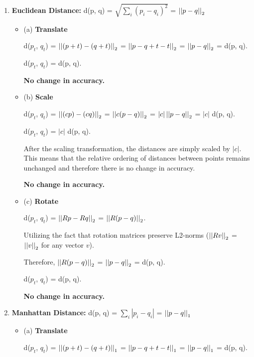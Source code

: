 \documentclass[fleqn]{article}
\begin{document}
\begin{enumerate}
	\item \textbf{Euclidean Distance:} d(p, q) = $\sqrt{\sum_i (p_i - q_i)^2}$ = $\left\vert\left\vert p - q \right\vert\right\vert_2$
	      \begin{itemize}
		      \item (a) \textbf{Translate}

		            d($p_t$, $q_t$) = $\left\vert\left\vert (p + t) - (q + t) \right\vert\right\vert_2$ = $\left\vert\left\vert p - q + t  - t \right\vert\right\vert_2$ = $\left\vert\left\vert p - q \right\vert\right\vert_2$ = d(p, q).

		            d($p_t$, $q_t$) = d(p, q).

		            \textbf{No change in accuracy.}

		      \item (b) \textbf{Scale}

		            d($p_t$, $q_t$) = $\left\vert\left\vert (c p) - (c q) \right\vert\right\vert_2$ = $\left\vert\left\vert c (p - q) \right\vert\right\vert_2$ = $|c| \left\vert\left\vert p - q \right\vert\right\vert_2$ = $|c|$ d(p, q).

		            d($p_t$, $q_t$) = $|c|$ d(p, q).

		            After the scaling transformation, the distances are simply scaled by $|c|$.
		            This means that the relative ordering of distances between points remains unchanged and therefore there is no change in accuracy.

		            \textbf{No change in accuracy.}

		      \item (c) \textbf{Rotate}

		            d($p_t$, $q_t$) = $\left\vert\left\vert R p - R q \right\vert\right\vert_2$ = $\left\vert\left\vert R (p - q) \right\vert\right\vert_2$.

		            Utilizing the fact that rotation matrices preserve L2-norms ($\left\vert\left\vert Rv \right\vert\right\vert_2$ = $\left\vert\left\vert v \right\vert\right\vert_2$ for any vector $v$).

		            Therefore, $\left\vert\left\vert R (p - q) \right\vert\right\vert_2$ = $\left\vert\left\vert p - q \right\vert\right\vert_2$ = d(p, q).

		            d($p_t$, $q_t$) = d(p, q).

		            \textbf{No change in accuracy.}
	      \end{itemize}

	\item \textbf{Manhattan Distance:} d(p, q) = $\sum_i |p_i - q_i|$ = $\left\vert\left\vert p - q \right\vert\right\vert_1$
	      \begin{itemize}
		      \item (a) \textbf{Translate}

		            d($p_t$, $q_t$) = $\left\vert\left\vert (p + t) - (q + t) \right\vert\right\vert_1$ = $\left\vert\left\vert p - q + t  - t \right\vert\right\vert_1$ = $\left\vert\left\vert p - q \right\vert\right\vert_1$ = d(p, q).


\end{itemize}
\end{enumerate}
\end{document}
